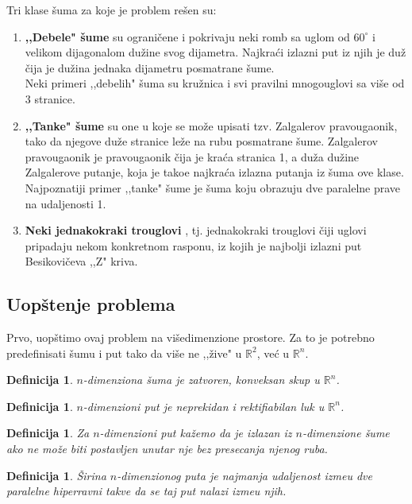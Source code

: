 \documentclass[11pt,letter]{article}
\newtheorem{df}[teo]{\bf Definicija}
\begin{document}
Tri klase \v suma za koje je problem re\v sen su:
\begin{enumerate}
\item \textbf{,,Debele" \v sume} \cite{Finch} su ograni\v cene i pokrivaju neki romb sa uglom od $60^\circ$ i velikom dijagonalom du\v zine svog dijametra. Najkra\' ci izlazni put iz njih je du\v z \v cija je du\v zina jednaka dijametru posmatrane \v sume. 
\\
Neki primeri  ,,debelih" \v suma su kru\v znica i svi pravilni mnogouglovi sa vi\v se od 3 stranice.
\item \textbf{,,Tanke" \v sume} \cite{Zalgaller} su one u koje se mo\v ze upisati tzv. Zalgalerov pravougaonik, tako da njegove du\v ze stranice le\v ze na rubu posmatrane \v sume. Zalgalerov pravougaonik je pravougaonik \v cija je kra\' ca stranica 1, a du\v za du\v zine Zalgalerove putanje, koja je tako\dj e najkra\' ca izlazna putanja iz \v suma ove klase.
\\
Najpoznatiji primer ,,tanke" \v sume je \v suma koju obrazuju dve paralelne prave na udaljenosti 1.
\item \textbf{Neki jednakokraki trouglovi} \cite{Besikovic}, tj. jednakokraki trouglovi \v ciji uglovi pripadaju nekom konkretnom rasponu, iz kojih je najbolji izlazni put Besikovi\v ceva ,,Z" kriva.
\end{enumerate}
\smallskip
\subsection[Uop\v stenje problema]{Uop\v stenje problema}
\bigskip
Prvo, uop\v stimo ovaj problem na vi\v sedimenzione prostore. Za to je potrebno predefinisati \v sumu i put tako da vi\v se ne ,,\v zive" u $\mathbb{R}^2$, ve\' c u $\mathbb{R}^n$.
\smallskip
\begin{df} $n$-dimenziona \v suma je zatvoren, konveksan skup u $\mathbb{R}^n$.\end{df}
\begin{df} $n$-dimenzioni put je neprekidan i rektifiabilan luk u $\mathbb{R}^n$.\end{df}
\begin{df} Za $n$-dimenzioni put ka\v zemo da je izlazan iz $n$-dimenzione \v sume ako ne mo\v ze biti postavljen unutar nje bez presecanja njenog ruba.\end{df}
\begin{df} \v Sirina $n$-dimenzionog puta je najmanja udaljenost izme\dj u dve paralelne hiperravni takve da se taj put nalazi izme\dj u njih. \end{df}
\smallskip
\end{document}

